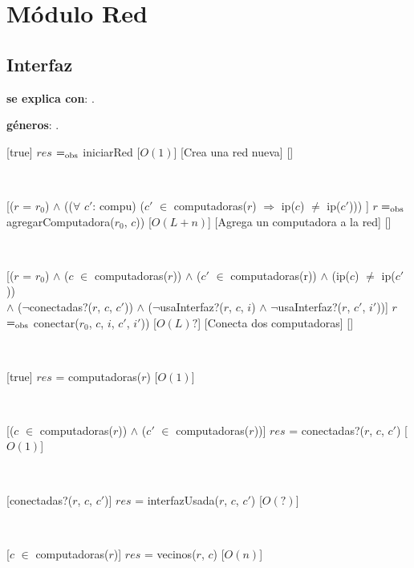 \section{Módulo Red}

\subsection{Interfaz}

\textbf{se explica con}: .

\textbf{géneros}: .

  [true]
  {$res$ $=_{\mathrm{obs}}$ iniciarRed}
  [$O(1)$]
  [Crea una red nueva]
  []

  ~

  [($r$ = $r_0$) $\land$ (($\forall$ $c'$: compu) ($c'$ $\in$ computadoras($r$) $\Rightarrow$  ip($c$) $\neq$  ip($c'$)))  ]
  {$r$ $=_{\mathrm{obs}}$ agregarComputadora($r_0$, $c$)) }
  [$O(L + n)$]
  [Agrega un computadora a la red]
  []

  ~

  [($r$ = $r_0$) $\land$ ($c$ $\in$ computadoras($r$)) $\land$ ($c'$ $\in$ computadoras(r)) $\land$ (ip($c$) $\neq$ ip($c'$)) \\
   $\land$ ($\neg$conectadas?($r$, $c$, $c'$)) $\land$ ($\neg$usaInterfaz?($r$, $c$, $i$) $\land$ $\neg$usaInterfaz?($r$, $c'$, $i'$))]
  {$r$ $=_{\mathrm{obs}}$ conectar($r_0$, $c$, $i$, $c'$, $i'$))}
  [$O(L) ?$]
  [Conecta dos computadoras]
  []

  ~

  [true]
  {$res$ = computadoras($r$)}
  [$O(1)$]

  ~

  [($c$ $\in$ computadoras($r$)) $\land$ ($c'$ $\in$ computadoras($r$))]
  {$res$ = conectadas?($r$, $c$, $c'$)}
  [$O(1)$]

  ~

  [conectadas?($r$, $c$, $c'$)]
  {$res$ = interfazUsada($r$, $c$, $c'$)}
  [$O(?)$]

  ~

  [$c$ $\in$ computadoras($r$)]
  {$res$ = vecinos($r$, $c$)}
  [$O(n)$]

